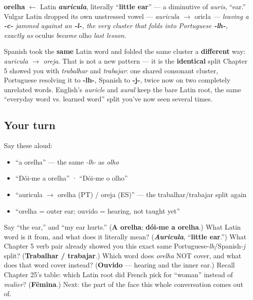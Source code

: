 \begin{cousinweb}
\textbf{orelha} $\leftarrow$ Latin \emph{\textbf{auricula}}, literally \textquotedblleft{}\textbf{little ear}\textquotedblright{} — a diminutive of \emph{auris}, \textquotedblleft{}ear.\textquotedblright{} Vulgar Latin dropped its own unstressed vowel — \emph{auricula $\to$ }oricla\emph{ — leaving a \textbf{-c-} jammed against an \textbf{-l-}, the very cluster that folds into Portuguese \textbf{-lh-}, exactly as }oculus\emph{ became }olho\emph{ last lesson.}

Spanish took the \textbf{same} Latin word and folded the same cluster a \textbf{different} way: \emph{auricula $\to$ oreja}. That is not a new pattern — it is the \textbf{identical} split Chapter 5 showed you with \emph{trabalhar} and \emph{trabajar}: one shared consonant cluster, Portuguese resolving it to \textbf{-lh-}, Spanish to \textbf{-j-}, twice now on two completely unrelated words. English's \emph{auricle} and \emph{aural} keep the bare Latin root, the same \textquotedblleft{}everyday word vs. learned word\textquotedblright{} split you've now seen several times.
\end{cousinweb}

\subsection*{Your turn}
Say these aloud:

\begin{itemize}
\raggedright
  \item \textquotedblleft{}a orelha\textquotedblright{} — the same \emph{-lh-} as \emph{olho}
  \item \textquotedblleft{}Dói-me a orelha\textquotedblright{} · \textquotedblleft{}Dói-me o olho\textquotedblright{}
  \item \textquotedblleft{}auricula $\to$ orelha (PT) / oreja (ES)\textquotedblright{} — the trabalhar/trabajar split again
  \item \textquotedblleft{}orelha = outer ear; ouvido = hearing, not taught yet\textquotedblright{}
\end{itemize}

\begin{tcolorbox}[breakable,colback=teal!4,colframe=teal!35!black,title={Before you move on}]
Say \textquotedblleft{}the ear,\textquotedblright{} and \textquotedblleft{}my ear hurts.\textquotedblright{} (\textbf{A orelha}; \textbf{dói-me a orelha}.) What Latin word is it from, and what does it literally mean? (\emph{\textbf{Auricula}}, \textquotedblleft{}\textbf{little ear}.\textquotedblright{}) What Chapter 5 verb pair already showed you this exact same Portuguese-\emph{lh}/Spanish-\emph{j} split? (\textbf{Trabalhar / trabajar}.) Which word does \emph{orelha} NOT cover, and what does that word cover instead? (\textbf{Ouvido} — hearing and the inner ear.) Recall Chapter 25's table: which Latin root did French pick for \textquotedblleft{}woman\textquotedblright{} instead of \emph{mulier}? (\textbf{Fēmina}.) Next: the part of the face this whole conversation comes out of.
\end{tcolorbox}
